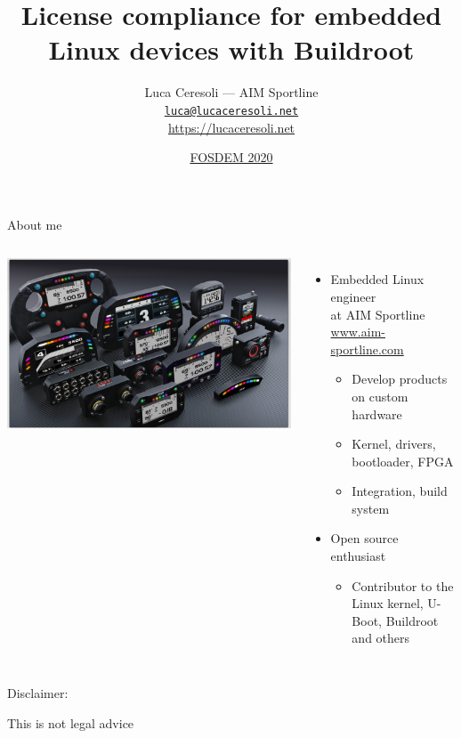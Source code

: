 \documentclass[xetex,table]{beamer}
\title{License compliance for embedded Linux devices with Buildroot}
\author{Luca Ceresoli --- AIM Sportline\\
  \href{mailto:luca@lucaceresoli.net}{\tt luca@lucaceresoli.net}\\
  \url{https://lucaceresoli.net}
}
\date{\href{https://fosdem.org/2020/schedule/event/buildroot_license_compliance/}{FOSDEM 2020}}
\begin{document}
\maketitle

\begin{frame}{About me}
  \begin{columns}
    \includegraphics[width=\textwidth]{../common/images/aim-products.jpg}

    \begin{itemize}
    \item Embedded Linux engineer\\
      at AIM Sportline\\
      {\footnotesize\href{https://www.aim-sportline.com/}{www.aim-sportline.com}}
      \begin{itemize}
      \item Develop products on custom hardware
      \item Kernel, drivers, bootloader, FPGA
      \item Integration, build system
      \end{itemize}
    \item Open source enthusiast
      \begin{itemize}
      \item Contributor to the Linux kernel, U-Boot, Buildroot and others
      \end{itemize}
    \end{itemize}
  \end{columns}
\end{frame}

\begin{frame}
  \Huge
  \begin{center}
    {\scalebox{3}{\Huge\faExclamationTriangle}}

    Disclaimer:

    This is not legal advice
  \end{center}
\end{frame}
\end{document}
